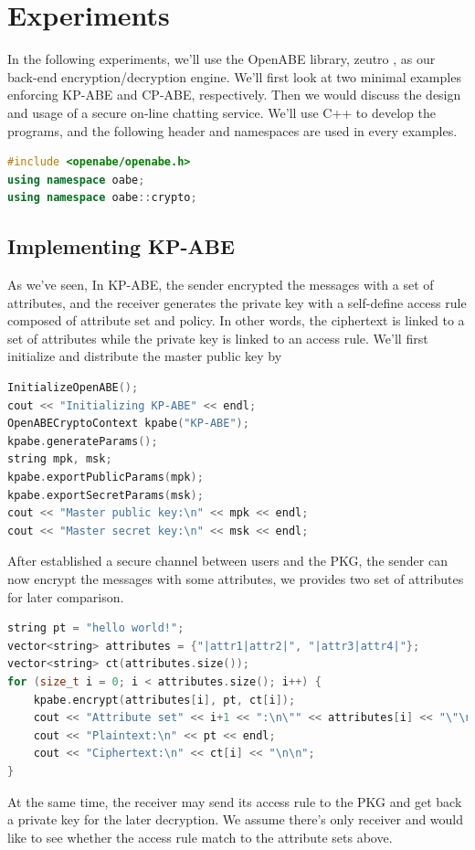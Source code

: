 \documentclass[12pt]{article}
\begin{document}
\section{Experiments}
In the following experiments, we'll use the OpenABE library, zeutro \cite{Zeu:18}, as our back-end encryption/decryption engine. We'll first look at two minimal examples enforcing KP-ABE and CP-ABE, respectively. Then we would discuss the design and usage of a secure on-line chatting service. We'll use C++ to develop the programs, and the following header and namespaces are used in every examples.
\begin{lstlisting}[language=c++]
#include <openabe/openabe.h>
using namespace oabe;
using namespace oabe::crypto;
\end{lstlisting}
\subsection{Implementing KP-ABE}
As we've seen, In KP-ABE, the sender encrypted the messages with a set of attributes, and the receiver generates the private key with a self-define access rule composed of attribute set and policy. In other words, the ciphertext is linked to a set of attributes while the private key is linked to an access rule. We'll first initialize and distribute the master public key by
\begin{lstlisting}[language=c++]
InitializeOpenABE();
cout << "Initializing KP-ABE" << endl;
OpenABECryptoContext kpabe("KP-ABE");
kpabe.generateParams();
string mpk, msk;
kpabe.exportPublicParams(mpk);
kpabe.exportSecretParams(msk);
cout << "Master public key:\n" << mpk << endl;
cout << "Master secret key:\n" << msk << endl;
\end{lstlisting}
After established a secure channel between users and the PKG, the sender can now encrypt the messages with some attributes, we provides two set of attributes for later comparison.
\begin{lstlisting}[language=c++]
string pt = "hello world!";
vector<string> attributes = {"|attr1|attr2|", "|attr3|attr4|"};
vector<string> ct(attributes.size());
for (size_t i = 0; i < attributes.size(); i++) {
    kpabe.encrypt(attributes[i], pt, ct[i]);
    cout << "Attribute set" << i+1 << ":\n\"" << attributes[i] << "\"\n";
    cout << "Plaintext:\n" << pt << endl;
    cout << "Ciphertext:\n" << ct[i] << "\n\n";
}
\end{lstlisting}
At the same time, the receiver may send its access rule to the PKG and get back a private key for the later decryption. We assume there's only receiver and would like to see whether the access rule match to the attribute sets above.
\end{document}
